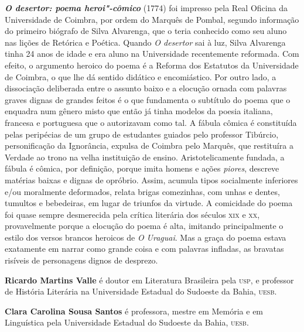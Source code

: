 \textbf{\textit{O desertor: poema heroi"-cômico}} (1774) foi impresso pela Real
Oficina da Universidade de Coimbra, por ordem do Marquês de Pombal,
segundo informação do primeiro biógrafo de Silva Alvarenga, que o teria conhecido
como seu aluno nas lições de Retórica e Poética.
Quando \textit{O desertor} sai à luz, Silva Alvarenga tinha 24 anos de
idade e era aluno na Universidade recentemente reformada.
Com efeito, o argumento heroico do poema é a Reforma dos Estatutos da
Universidade de Coimbra, o que lhe dá sentido didático e encomiástico.
Por outro lado, a dissociação deliberada entre o assunto baixo e a elocução
ornada com palavras graves dignas de grandes feitos é o que fundamenta o
subtítulo do poema que o enquadra num gênero misto que então já tinha modelos
da poesia italiana, francesa e portuguesa que o autorizavam como tal.
A fábula cômica é constituída pelas peripécias de um grupo de estudantes
guiados pelo professor Tibúrcio, personificação da Ignorância, expulsa
de Coimbra pelo Marquês, que restituíra a Verdade ao trono na velha
instituição de ensino.
Aristotelicamente fundada, a fábula é cômica, por definição, porque imita
homens e ações \textit{piores}, descreve matérias baixas e dignas de opróbrio.
Assim, acumula tipos socialmente inferiores e/ou moralmente deformados,
relata brigas comezinhas, com unhas e dentes, tumultos e bebedeiras, em lugar
de triunfos da virtude.
A comicidade do poema foi quase sempre desmerecida pela crítica literária
dos séculos \textsc{xix} e \textsc{xx}, provavelmente porque a elocução do poema é alta,
imitando principalmente o estilo dos versos brancos heroicos de \textit{O Uraguai}.
Mas a graça do poema estava exatamente em narrar como grande coisa e com palavras
infladas, as bravatas risíveis de personagens dignos de desprezo.


\textbf{Ricardo Martins Valle} é doutor em Literatura Brasileira pela
\textsc{usp}, e professor de História Literária na Universidade Estadual do
Sudoeste da Bahia, \textsc{uesb}.


\textbf{Clara Carolina Sousa Santos} é professora, mestre em Memória e em Linguística pela Universidade Estadual do Sudoeste da Bahia, \textsc{uesb}. 


